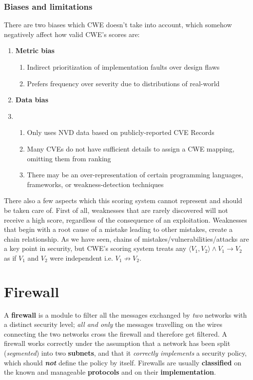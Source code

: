 \subsubsection{Biases and limitations}
There are two biases which CWE doesn't take into account,
which somehow negatively affect how valid CWE's scores are:
\begin{enumerate}
   \item \textbf{Metric bias}
   \begin{enumerate}
      \item 
      Indirect prioritization of implementation faults over design flaws
      \item 
      Prefers frequency over severity due to distributions of real-world
   \end{enumerate}
   \item \textbf{Data bias}
   \item \begin{enumerate}
      \item Only uses NVD data based on publicly-reported CVE Records
      \item Many CVEs do not have sufficient details to assign a CWE
      mapping, omitting them from ranking
      \item There may be an over-representation of certain programming
      languages, frameworks, or weakness-detection techniques
   \end{enumerate}
\end{enumerate} 

There also a few aspects which this scoring system cannot represent and should be taken care of.
First of all,
weaknesses that are rarely discovered will not receive a high score,
regardless of the consequence of an exploitation.
Weaknesses that begin with a root cause of a mistake leading to
other mistakes, create a chain relationship.
As we have seen, chains of mistakes/vulnerabilities/attacks are a key point in security,
but CWE's scoring system treats any $\langle V_1, V_2 \rangle \wedge V_1 \rightarrow V_2$ as if $V_1$ and $V_2$ were independent i.e. $V_1 \not\rightarrow V_2$.


\section{Firewall}
A \textbf{firewall} is a module to filter all the messages exchanged by \textit{two} networks with a distinct security level;
\textit{all and only} the messages travelling on the wires
connecting the two networks cross the firewall and therefore get filtered.
A firewall works correctly under the assumption that a network has been split (\textit{segmented}) into two \textbf{subnets}, 
and that it \textit{correctly implements} a security policy, which should \textit{\textbf{not}} define the policy by itself.
Firewalls are usually \textbf{classified} on the known and manageable \textbf{protocols} and on their \textbf{implementation}.

